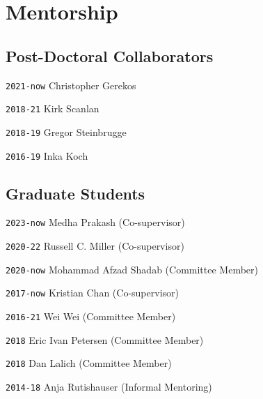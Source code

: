 \section*{Mentorship}

\TabPositions{6em,20em,28em}

\subsection*{Post-Doctoral Collaborators}

\noindent \texttt{2021-now} \tab Christopher Gerekos 

\noindent \texttt{2018-21} \tab Kirk Scanlan 

\noindent \texttt{2018-19} \tab Gregor Steinbrugge

\noindent \texttt{2016-19} \tab Inka Koch

\vspace{-1em}
\subsection*{Graduate Students}

\noindent \texttt{2023-now} \tab Medha Prakash \tab [PhD] \tab (Co-supervisor)

\noindent \texttt{2020-22} \tab Russell C. Miller \tab [MS] \tab (Co-supervisor)

\noindent \texttt{2020-now} \tab Mohammad Afzad Shadab \tab [PhD] \tab (Committee Member)

\noindent \texttt{2017-now} \tab Kristian Chan \tab [PhD] \tab (Co-supervisor)

\noindent \texttt{2016-21} \tab Wei Wei \tab [PhD] \tab (Committee Member)

\noindent \texttt{2018} \tab Eric Ivan Petersen  \tab [PhD] \tab (Committee Member)

\noindent \texttt{2018} \tab Dan Lalich \tab [PhD] \tab (Committee Member)

\noindent \texttt{2014-18} \tab Anja Rutishauser  \tab (Informal Mentoring)

